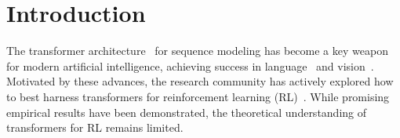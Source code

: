 \documentclass[10pt]{article}
\newcommand{\<}{\left\langle}
\renewcommand{\>}{\right\rangle}
\newcommand{\authnote}[2]{{\scriptsize $\ll$\textsf{#1 notes: #2}$\gg$}}
\newcommand{\authnote}[2]{}
\newcommand{\yub}[1]{{\color{red}\authnote{Yu}{#1}}}
\begin{document}
\begin{abstract}

\end{abstract}
% 
\section{Introduction}


The transformer architecture~\citep{vaswani2017attention} for sequence modeling has become a key weapon for modern artificial intelligence, achieving success in language~\citep{devlin2018bert,brown2020language,openai2023gpt} and vision~\citep{dosovitskiy2020image}. Motivated by these advances, the research community has actively explored how to best harness transformers for reinforcement learning (RL)~\citep{chen2021decision, janner2021offline, lee2022multi, reed2022generalist, laskin2022context, lee2023supervised,yang2023foundation}. While promising empirical results have been demonstrated, the theoretical understanding of transformers for RL remains limited. %
\end{document}
